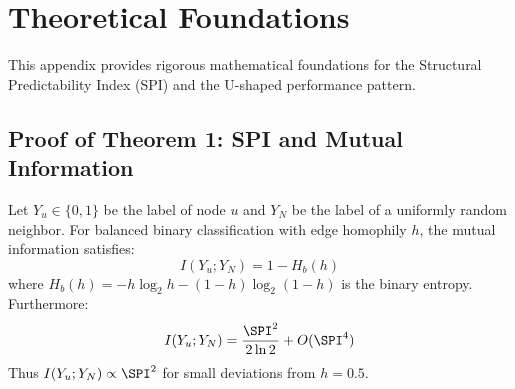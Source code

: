 
\appendix
\section{Theoretical Foundations}
\label{sec:appendix_theory}

This appendix provides rigorous mathematical foundations for the Structural Predictability Index (SPI) and the U-shaped performance pattern.

\subsection{Proof of Theorem 1: SPI and Mutual Information}

\begin{theorem}
Let $Y_u \in \{0, 1\}$ be the label of node $u$ and $Y_N$ be the label of a uniformly random neighbor. For balanced binary classification with edge homophily $h$, the mutual information satisfies:
\begin{equation}
    I(Y_u; Y_N) = 1 - H_b(h)
\end{equation}
where $H_b(h) = -h\log_2 h - (1-h)\log_2(1-h)$ is the binary entropy. Furthermore:
\begin{equation}
    I(Y_u; Y_N) = \frac{\SPI^2}{2\ln 2} + O(\SPI^4)
\end{equation}
Thus $I(Y_u; Y_N) \propto \SPI^2$ for small deviations from $h = 0.5$.
\end{theorem}

